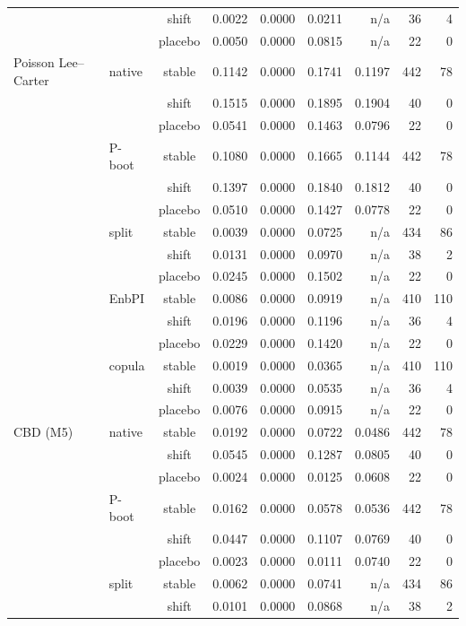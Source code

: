 {\begin{longtable}{@{}llcrrrrrr@{}}
 &  & shift & 0.0022 & 0.0000 & 0.0211 & n/a & 36 & 4 \\
 &  & placebo & 0.0050 & 0.0000 & 0.0815 & n/a & 22 & 0 \\
\addlinespace[2pt]
Poisson Lee--Carter & native & stable & 0.1142 & 0.0000 & 0.1741 & 0.1197 & 442 & 78 \\
 &  & shift & 0.1515 & 0.0000 & 0.1895 & 0.1904 & 40 & 0 \\
 &  & placebo & 0.0541 & 0.0000 & 0.1463 & 0.0796 & 22 & 0 \\
 & P-boot & stable & 0.1080 & 0.0000 & 0.1665 & 0.1144 & 442 & 78 \\
 &  & shift & 0.1397 & 0.0000 & 0.1840 & 0.1812 & 40 & 0 \\
 &  & placebo & 0.0510 & 0.0000 & 0.1427 & 0.0778 & 22 & 0 \\
 & split & stable & 0.0039 & 0.0000 & 0.0725 & n/a & 434 & 86 \\
 &  & shift & 0.0131 & 0.0000 & 0.0970 & n/a & 38 & 2 \\
 &  & placebo & 0.0245 & 0.0000 & 0.1502 & n/a & 22 & 0 \\
 & EnbPI & stable & 0.0086 & 0.0000 & 0.0919 & n/a & 410 & 110 \\
 &  & shift & 0.0196 & 0.0000 & 0.1196 & n/a & 36 & 4 \\
 &  & placebo & 0.0229 & 0.0000 & 0.1420 & n/a & 22 & 0 \\
 & copula & stable & 0.0019 & 0.0000 & 0.0365 & n/a & 410 & 110 \\
 &  & shift & 0.0039 & 0.0000 & 0.0535 & n/a & 36 & 4 \\
 &  & placebo & 0.0076 & 0.0000 & 0.0915 & n/a & 22 & 0 \\
\addlinespace[2pt]
CBD (M5) & native & stable & 0.0192 & 0.0000 & 0.0722 & 0.0486 & 442 & 78 \\
 &  & shift & 0.0545 & 0.0000 & 0.1287 & 0.0805 & 40 & 0 \\
 &  & placebo & 0.0024 & 0.0000 & 0.0125 & 0.0608 & 22 & 0 \\
 & P-boot & stable & 0.0162 & 0.0000 & 0.0578 & 0.0536 & 442 & 78 \\
 &  & shift & 0.0447 & 0.0000 & 0.1107 & 0.0769 & 40 & 0 \\
 &  & placebo & 0.0023 & 0.0000 & 0.0111 & 0.0740 & 22 & 0 \\
 & split & stable & 0.0062 & 0.0000 & 0.0741 & n/a & 434 & 86 \\
 &  & shift & 0.0101 & 0.0000 & 0.0868 & n/a & 38 & 2 \\

\end{longtable}}
